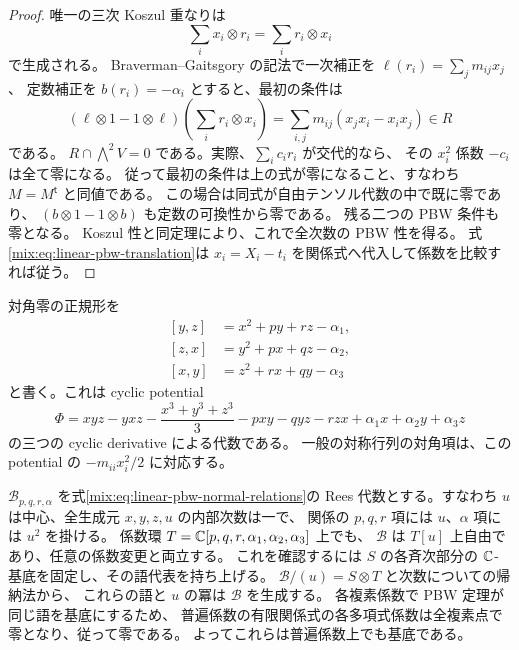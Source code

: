 \begin{proof}
唯一の三次 Koszul 重なりは
\[
       \sum_i x_i\otimes r_i=\sum_i r_i\otimes x_i
\]
で生成される。
Braverman--Gaitsgory の記法で一次補正を $\ell(r_i)=\sum_jm_{ij}x_j$、
定数補正を $b(r_i)=-\alpha_i$ とすると、最初の条件は
\[
 (\ell\otimes1-1\otimes\ell)
       \left(\sum_i r_i\otimes x_i\right)
 =\sum_{i,j}m_{ij}(x_jx_i-x_ix_j)\in R
\]
である\cite[Main Theorem~0.5, Lemma~3.3]{CMOBravermanGaitsgory}。
$R\cap\bigwedge^2V=0$ である。実際、$\sum_i c_ir_i$ が交代的なら、
その $x_i^2$ 係数 $-c_i$ は全て零になる。
従って最初の条件は上の式が零になること、すなわち $M=M^{\mathsf t}$ と同値である。
この場合は同式が自由テンソル代数の中で既に零であり、
$(b\otimes1-1\otimes b)$ も定数の可換性から零である。
残る二つの PBW 条件も零となる。
Koszul 性と同定理により、これで全次数の PBW 性を得る。
式\eqref{mix:eq:linear-pbw-translation}は
$x_i=X_i-t_i$ を関係式へ代入して係数を比較すれば従う。
\end{proof}

対角零の正規形を
\begin{equation}\label{mix:eq:linear-pbw-normal-relations}
 \begin{split}
 [y,z]&=x^2+py+rz-\alpha_1,\\
 [z,x]&=y^2+px+qz-\alpha_2,\\
 [x,y]&=z^2+rx+qy-\alpha_3
 \end{split}
\end{equation}
と書く。これは cyclic potential
\begin{equation}\label{mix:eq:linear-pbw-potential}
 \Phi=xyz-yxz-\frac{x^3+y^3+z^3}{3}
       -pxy-qyz-rzx+\alpha_1x+\alpha_2y+\alpha_3z
\end{equation}
の三つの cyclic derivative による代数である。
一般の対称行列の対角項は、この potential の $-m_{ii}x_i^2/2$ に対応する。

$\mathcal B_{p,q,r,\alpha}$ を式\eqref{mix:eq:linear-pbw-normal-relations}の
Rees 代数とする。すなわち $u$ は中心、全生成元 $x,y,z,u$ の内部次数は一で、
関係の $p,q,r$ 項には $u$、$\alpha$ 項には $u^2$ を掛ける。
係数環 $T=\mathbb C[p,q,r,\alpha_1,\alpha_2,\alpha_3]$ 上でも、
$\mathcal B$ は $T[u]$ 上自由であり、任意の係数変更と両立する。
これを確認するには $S$ の各斉次部分の $\mathbb C$-基底を固定し、その語代表を持ち上げる。
$\mathcal B/(u)=S\otimes T$ と次数についての帰納法から、
これらの語と $u$ の冪は $\mathcal B$ を生成する。
各複素係数で PBW 定理が同じ語を基底にするため、
普遍係数の有限関係式の各多項式係数は全複素点で零となり、従って零である。
よってこれらは普遍係数上でも基底である。

